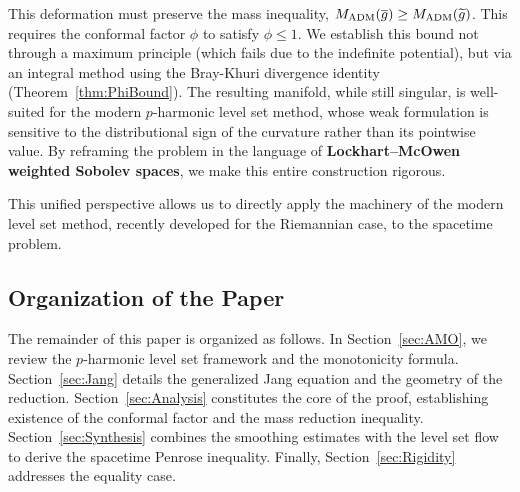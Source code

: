 This deformation must preserve the mass inequality, $M_{\mathrm{ADM}}(\overline{g}) \ge M_{\mathrm{ADM}}(\widetilde{g})$. This requires the conformal factor $\phi$ to satisfy $\phi \le 1$. We establish this bound not through a maximum principle (which fails due to the indefinite potential), but via an integral method using the Bray-Khuri divergence identity (Theorem~\ref{thm:PhiBound}). The resulting manifold, while still singular, is well-suited for the modern $p$-harmonic level set method, whose weak formulation is sensitive to the distributional sign of the curvature rather than its pointwise value. By reframing the problem in the language of \textbf{Lockhart--McOwen weighted Sobolev spaces}, we make this entire construction rigorous.

This unified perspective allows us to directly apply the machinery of the modern level set method, recently developed for the Riemannian case, to the spacetime problem.

\subsection{Organization of the Paper}
The remainder of this paper is organized as follows. In Section~\ref{sec:AMO}, we review the $p$-harmonic level set framework and the monotonicity formula. Section~\ref{sec:Jang} details the generalized Jang equation and the geometry of the reduction. Section~\ref{sec:Analysis} constitutes the core of the proof, establishing existence of the conformal factor and the mass reduction inequality. Section~\ref{sec:Synthesis} combines the smoothing estimates with the level set flow to derive the spacetime Penrose inequality. Finally, Section~\ref{sec:Rigidity} addresses the equality case.

